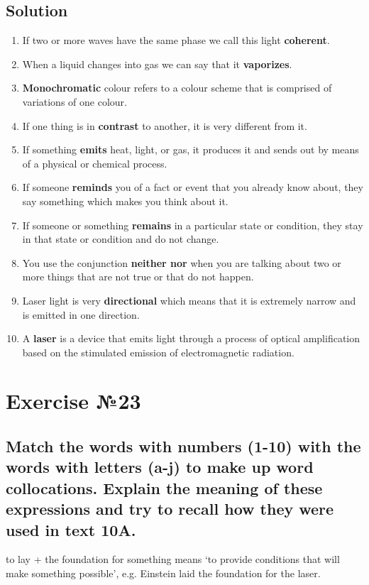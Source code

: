\subsection*{Solution}
\begin{enumerate}
      \item If two or more waves have the same phase we call this light
            \textbf{coherent}.
      \item When a liquid changes into gas we can say that it \textbf{vaporizes}.
      \item \textbf{Monochromatic} colour refers to a colour scheme that is
            comprised of variations of one colour.
      \item If one thing is in \textbf{contrast} to another, it is very different
            from it.
      \item If something \textbf{emits} heat, light, or gas, it produces it and
            sends out by means of a physical or chemical process.
      \item If someone \textbf{reminds} you of a fact or event that you already
            know about, they say something which makes you think about it.
      \item If someone or something \textbf{remains} in a particular state or
            condition, they stay in that state or condition and do not change.
      \item You use the conjunction \textbf{neither nor} when you are talking about
            two or more things that are not true or that do not happen.
      \item Laser light is very \textbf{directional} which means that it is
            extremely narrow and is emitted in one direction.
      \item A \textbf{laser} is a device that emits light through a process of
            optical amplification based on the stimulated emission of electromagnetic
            radiation.
\end{enumerate}

\section{Exercise №23}
\subsection*{Match the words with numbers (1-10) with the words with letters (a-j) to
      make up word collocations. Explain the meaning of these expressions and try to
      recall how they were used in text 10A.}
to lay + the foundation for something means ‘to provide conditions
that will make something possible’, e.g. Einstein laid the foundation for the laser.

